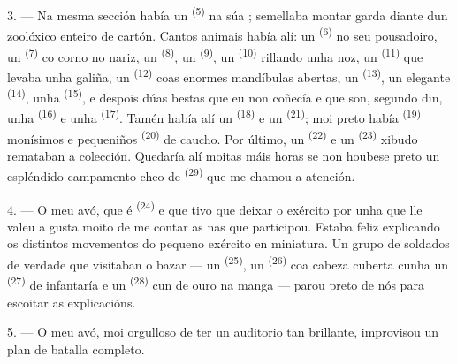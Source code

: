 3. --- Na mesma sección había un  \textsuperscript{(5)} na súa
; semellaba montar garda diante dun zoolóxico enteiro de cartón. Cantos
animais había alí: un  \textsuperscript{(6)} no seu pousadoiro, un
 \textsuperscript{(7)} co corno no nariz, un 
\textsuperscript{(8)}, un  \textsuperscript{(9)}, un 
\textsuperscript{(10)} rillando unha noz, un  \textsuperscript{(11)}
que levaba unha galiña, un  \textsuperscript{(12)} coas enormes
mandíbulas abertas, un  \textsuperscript{(13)}, un elegante
 \textsuperscript{(14)}, unha 
\textsuperscript{(15)}, e despois dúas bestas que eu non coñecía e que son, segundo
din, unha  \textsuperscript{(16)} e unha 
\textsuperscript{(17)}. Tamén había alí un  \textsuperscript{(18)} e
un  \textsuperscript{(21)}; moi preto había 
\textsuperscript{(19)} monísimos e  pequeniños \textsuperscript{(20)}
de caucho. Por último, un  \textsuperscript{(22)} e un
 \textsuperscript{(23)} xibudo remataban a colección. Quedaría alí
moitas máis horas se non houbese preto un espléndido campamento cheo de
 \textsuperscript{(29)} que me chamou a atención.

\VUsaut{4.0mm}
\VUsaut{2.8mm}

4. --- O meu avó, que é  \textsuperscript{(24)} e que tivo que deixar
o exército por unha  que lle valeu a  gusta
moito de me contar as  nas que participou. Estaba feliz explicando os
distintos movementos do pequeno exército en miniatura. Un grupo de soldados de verdade
que visitaban o bazar --- un  \textsuperscript{(25)}, un
 \textsuperscript{(26)} coa cabeza cuberta cunha
 un  \textsuperscript{(27)} de infantaría e un
 \textsuperscript{(28)} cun  de ouro na
manga --- parou preto de nós para escoitar as explicacións.

5. --- O meu avó, moi orgulloso de ter un auditorio tan brillante, improvisou un plan
de batalla completo.

